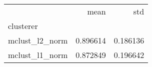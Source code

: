 \begin{tabular}{lrr}
\toprule
{} &      mean &       std \\
clusterer      &           &           \\
\midrule
mclust\_l2\_norm &  0.896614 &  0.186136 \\
mclust\_l1\_norm &  0.872849 &  0.196642 \\
\bottomrule
\end{tabular}

